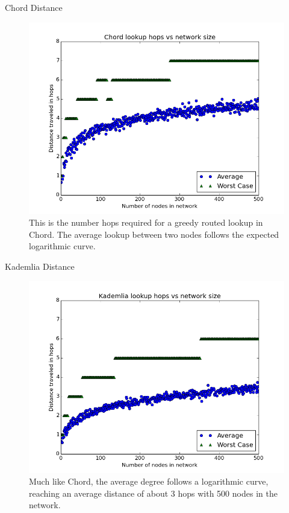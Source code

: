\documentclass[11pt]{beamer}
\begin{document}

\begin{frame}{Chord Distance}
\begin{figure}
	\centering
	\includegraphics[width=0.7\linewidth]{figs/ChordDistance}
	\caption[Chord hops]{This is the number hops required for a greedy routed lookup in Chord. The average lookup between two nodes follows the expected logarithmic curve.}
	\label{fig:ChordDistance}
\end{figure}
\end{frame}




\begin{frame}{Kademlia Distance}
\begin{figure}
	\centering
	\includegraphics[width=0.7\linewidth]{figs/KademliaDistance}
	\caption[Kademlia hops]{Much like Chord, the average degree follows a logarithmic curve, reaching an average distance of about 3 hops with 500 nodes in the network.}
	\label{fig:KademliaDistance}
\end{figure}
\end{frame}
\end{document}
